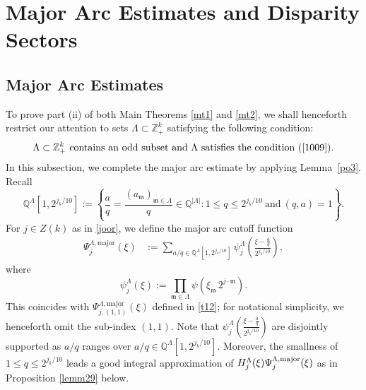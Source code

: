 \documentclass[11 pt,letterpaper]{amsart}
\theoremstyle{plain}
\theoremstyle{definition}
\theoremstyle{remark} \theoremstyle{exam} \theoremstyle{ob}
\numberwithin{equation}{section}
\begin{document}
 













  \section{Major Arc Estimates and Disparity Sectors}\label{sec3}
\subsection{Major Arc Estimates}To prove part (ii) of both Main Theorems \ref{mt1} and \ref{mt2}, we shall henceforth restrict our attention to sets $\Lambda\subset \mathbb{Z}_{+}^k$ satisfying the following condition: \begin{align}\label{wep2}
	\text{$\Lambda\subset \mathbb{Z}^k_+$ contains an odd subset  and $\Lambda$ satisfies the condition  (\ref{1009}).}
\end{align}  In this subsection, we complete the major arc estimate by applying Lemma~\ref{po3}. 
Recall
$$ \mathbb{Q}^{\Lambda}[1,2^{j_k/10}]:=  \left\{\frac{a}{q}=\frac{(a_{\mathfrak{m}})_{ \mathfrak{m}\in \Lambda }  }{q}\in  \mathbb{Q}^{|\Lambda|}: 1\le q \le 2^{j_{k}/10}\ \text{and}\  (q,a)=1\right\}.$$
For $j \in Z(k)$ as in \eqref{joor}, we define the major arc cutoff function
\begin{align*}
\Psi^{\Lambda,\mathrm{major}}_{j}(\xi)
&:= \sum_{a/q \in \mathbb{Q}^{\Lambda}[1,2^{j_k/10}]}
\psi_j^{\Lambda}\!\left( \frac{\xi-\frac{a}{q}}{2^{j_k/10}} \right),
\end{align*}
where
\[
\psi_j^{\Lambda}(\xi)
:= \prod_{\mathfrak{m}\in\Lambda}
\psi\!\left( \xi_{\mathfrak{m}}\, 2^{j\cdot \mathfrak{m}} \right).
\]
This coincides with $\Psi^{\Lambda,\mathrm{major}}_{j,(1,1)}(\xi)$ defined in \eqref{t12}; for notational simplicity, we henceforth omit the sub-index $(1,1)$.
Note that $\psi_j^{\Lambda}\left( \frac{\xi-\frac{a}{q}}{2^{j_{k}/10}} \right)$ are disjointly supported as $a/q$ ranges over $a/q\in \mathbb{Q}^{\Lambda}[1,2^{j_k/10}]$.   Moreover, the smallness of  $1\le q\le 2^{j_k/10}$ leads a  good integral approximation of $H_j^{\Lambda}(\xi) \Psi^{\Lambda,\rm{major}}_{j}(\xi)$ as in Proposition \ref{lemm29} below.
\end{document}
